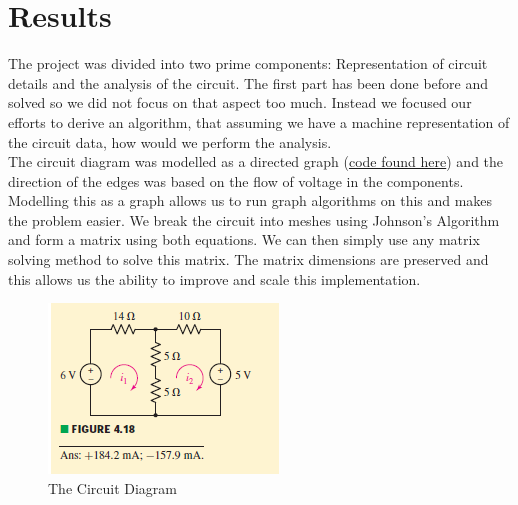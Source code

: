 \documentclass[conference]{IEEEtran}
\begin{document}
\section{\textbf{Results}}
    The project was divided into two prime components: Representation of circuit details and the analysis of the circuit. The first part has been done before and solved so we did not focus on that aspect too much. Instead we focused our efforts to derive an algorithm, that assuming we have a machine representation of the circuit data, how would we perform the analysis.\\
    \noindent
    The circuit diagram was modelled as a directed graph (\href{https://github.com/estineali/Hand-Drawn-Circuits}{code found here}) and the direction of the edges was based on the flow of voltage in the components. Modelling this as a graph allows us to run graph algorithms on this and makes the problem easier. We break the circuit into meshes using Johnson's Algorithm and form a matrix using both equations. We can then simply use any matrix solving method to solve this matrix. The matrix dimensions are preserved and this allows us the ability to improve and scale this implementation.\\
    \noindent
    
    \begin{figure}[h!]
        \centering
        \includegraphics{images/circuit_diag.PNG}
        \caption{The Circuit Diagram}
        \label{fig:circuit_and_answers}
    \end{figure}
    
\end{document}
